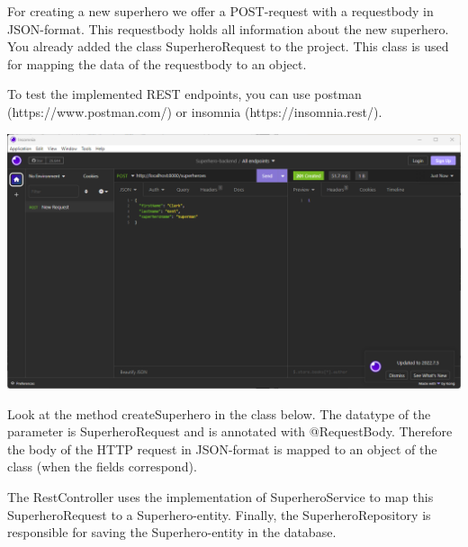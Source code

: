 \documentclass[a4paper, 12pt]{report}
\begin{document}
For creating a new superhero we offer a POST-request with a requestbody in JSON-format. This requestbody holds all information about the new superhero.  You already added the class SuperheroRequest to the project. This class is used for mapping the data of the requestbody to an object.

To test the implemented REST endpoints,  you can use postman (https://www.postman.com/) or insomnia (https://insomnia.rest/). 

\includegraphics[width=\textwidth]{./images/chapter2/post-request-insomnia.png} 

Look at the method createSuperhero in the class below. The datatype of the parameter is SuperheroRequest and is annotated with @RequestBody.  Therefore the body of the HTTP request in JSON-format is mapped to an object of the class (when the fields correspond). 

The RestController uses the implementation of SuperheroService to map this SuperheroRequest to a Superhero-entity. Finally, the SuperheroRepository is responsible for saving the Superhero-entity in the database. 
\end{document}
